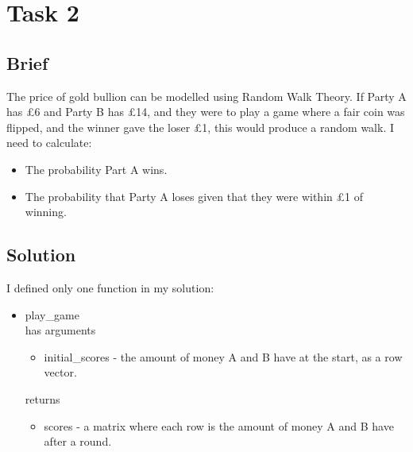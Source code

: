 \documentclass{article}
\begin{document}
\section{Task 2}
\subsection{Brief}
The price of gold bullion can be modelled using Random Walk Theory.
If Party A has £6 and Party B has £14, and they were to play a game where a fair coin was flipped, and the winner gave the loser £1, this would produce a random walk.
I need to calculate:
\begin{itemize}
    \item The probability Part A wins.
    \item The probability that Party A loses given that they were within £1 of winning.
\end{itemize}
\subsection{Solution}
I defined only one function in my solution:
\begin{itemize}
    \item play\_game \\
          has arguments
          \begin{itemize}
              \item initial\_scores - the amount of money A and B have at the start, as a row vector.
          \end{itemize}
          returns
          \begin{itemize}
              \item scores - a matrix where each row is the amount of money A and B have after a round.
          \end{itemize}
\end{itemize}
\newpage
\end{document}
